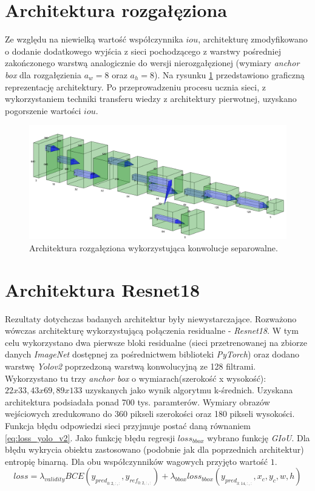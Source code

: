 \section{Architektura rozgałęziona}
Ze względu na niewielką wartość współczynnika $iou$, architekturę zmodyfikowano o dodanie dodatkowego wyjścia z sieci pochodzącego z warstwy pośredniej zakończonego warstwą analogicznie do wersji nierozgałęzionej (wymiary \emph{anchor box} dla rozgałęzienia $a_w = 8$ oraz  $a_h = 8$). Na rysunku \ref{fig:arch_v2} przedstawiono graficzną reprezentację architektury. Po przeprowadzeniu procesu ucznia sieci, z wykorzystaniem techniki transferu wiedzy z architektury pierwotnej, uzyskano pogorszenie wartości $iou$. 

\begin{figure}
    \centering
    \includegraphics[width=\linewidth]{images/Architektura_branched.png}
    \caption{Architektura rozgałęziona wykorzystująca konwolucje separowalne.}
    \label{fig:arch_v2}
\end{figure}


\section{Architektura Resnet18}
Rezultaty dotychczas badanych architektur były niewystarczające. Rozważono wówczas architekturę wykorzystującą połączenia residualne - \emph{Resnet18}\cite{resnet18}. 
W tym celu wykorzystano dwa pierwsze bloki residualne (sieci przetrenowanej na zbiorze danych \emph{ImageNet}\cite{imagenet} dostępnej za pośrednictwem biblioteki \emph{PyTorch}) oraz dodano warstwę \emph{Yolov2}\cite{yolov2} poprzedzoną warstwą konwolucyjną ze 128 filtrami. 
Wykorzystano tu trzy \emph{anchor box} o wymiarach(szerokość x wysokość): $22x33, 43x69, 89x133$ uzyskanych jako wynik algorytmu k-średnich. 
Uzyskana architektura podsiadała ponad 700 tys. paramterów.
Wymiary obrazów wejściowych zredukowano do 360 pikseli szerokości oraz 180 pikseli wysokości.
Funkcja błędu odpowiedzi sieci przyjmuje postać daną równaniem \eqref{eq:loss_yolo_v2}.
Jako funkcję błędu regresji $loss_{bbox}$ wybrano funkcję \emph{GIoU}\cite{giou}. Dla błędu wykrycia obiektu zastosowano (podobnie jak dla poprzednich architektur) entropię binarną. Dla obu współczynników wagowych przyjęto wartość $1$.
\begin{equation}
loss = \lambda_{validity} BCE(y_{pred}_{0:2,:,:}, y_{ref}_{0:2,:,:}) + \lambda_{bbox} loss_{bbox}(y_{pred}_{3:14,:,:}, x_c,y_c,w,h)
\label{eq:loss_yolo_v2}
\end{equation}


